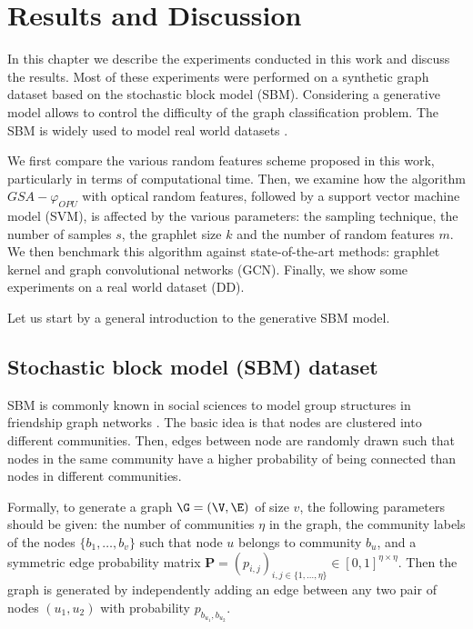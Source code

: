 \addchapheadtotoc
\chapter{Results and Discussion}
In this chapter we describe the experiments conducted in this work and discuss the results. Most of these experiments were performed on a synthetic graph dataset based on the stochastic block model (SBM). Considering a generative model allows to control the difficulty of the graph classification problem. The SBM is widely used to model real world datasets \citep{SBM}.

We first compare the various random features scheme proposed in this work, particularly in terms of computational time. Then, we examine how the algorithm $GSA-\varphi_{OPU}$ with optical random features, followed by a support vector machine model (SVM), is affected by the various parameters: the sampling technique, the number of samples $s$, the graphlet size $k$ and the number of random features $m$.
We then benchmark this algorithm against state-of-the-art methods: graphlet kernel and graph convolutional networks (GCN). %
Finally, we show some experiments on a real world dataset (DD). 

Let us start by a general introduction to the generative SBM model.
 
\section{Stochastic block model (SBM) dataset}

SBM is commonly known in social sciences to model group structures in friendship graph networks \citep{SBM}. The basic idea is that nodes are clustered into different communities. Then, edges between node are randomly drawn such that nodes in the same community have a higher probability of being connected than nodes in different communities.

Formally, to generate a graph $\G=(\V,\E)$ of size $v$, the following parameters should be given: the number of communities $\eta$ in the graph, the community labels of the nodes $\{b_1 , \ldots ,b_v\}$ such that node $u$ belongs to community $b_u$, and a symmetric edge probability matrix $\mathbf{P}=(p_{i,j})_{i,j\in\{1,\ldots, \eta\}} \in [0,1]^{\eta \times \eta}$.
Then the graph is generated by independently adding an edge between any two pair of nodes $(u_1,u_2)$ with probability $p_{b_{u_1} , b_{u_2}}$.

